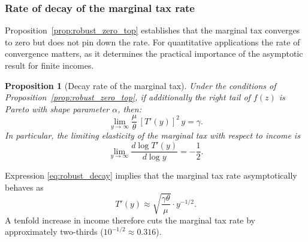 \documentclass[12pt,a4paper]{article}
\theoremstyle{definition}
\theoremstyle{plain}
\newtheorem{proposition}{Proposition}[section]
\theoremstyle{remark}
\begin{document}
\subsubsection{Rate of decay of the marginal tax rate}

Proposition~\ref{prop:robust_zero_top} establishes that the marginal tax converges to zero but does not pin down the rate. For quantitative applications the rate of convergence matters, as it determines the practical importance of the asymptotic result for finite incomes.

\begin{proposition}[Decay rate of the marginal tax]
\label{prop:robust_decay}
Under the conditions of Proposition~\ref{prop:robust_zero_top}, if additionally the right tail of $f(z)$ is Pareto with shape parameter $\alpha$, then:
\begin{equation}
\label{eq:robust_decay}
  \lim_{y \to \infty} \frac{\mu}{\theta}\, [T'(y)]^2\, y = \gamma.
\end{equation}
In particular, the limiting elasticity of the marginal tax with respect to income is
\begin{equation}
\label{eq:robust_elasticity}
  \lim_{y \to \infty} \frac{d\log T'(y)}{d\log y} = -\frac{1}{2}.
\end{equation}
\end{proposition}

Expression \eqref{eq:robust_decay} implies that the marginal tax rate asymptotically behaves as
\[
  T'(y) \approx \sqrt{\frac{\gamma\theta}{\mu}} \cdot y^{-1/2}.
\]
A tenfold increase in income therefore cuts the marginal tax rate by approximately two-thirds ($10^{-1/2} \approx 0.316$).
\end{document}
